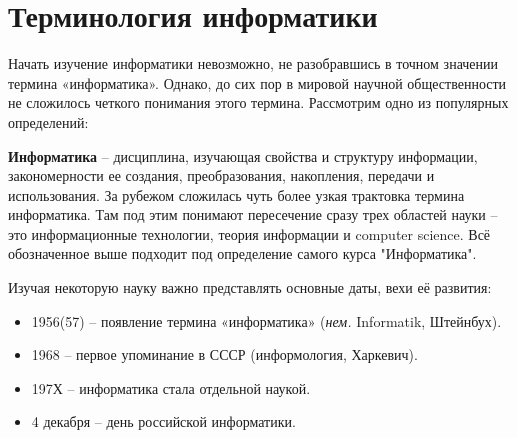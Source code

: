 \section{Терминология информатики}

Начать изучение информатики невозможно, не разобравшись в точном значении термина «информатика». Однако, до сих пор в мировой научной общественности не сложилось четкого понимания этого термина. Рассмотрим одно из популярных определений:

\textbf{Информатика} – дисциплина, изучающая свойства и структуру информации, закономерности ее создания, преобразования, накопления, передачи и использования. За рубежом сложилась чуть более узкая трактовка термина информатика. Там под этим понимают пересечение сразу трех областей науки – это информационные технологии, теория информации и computer science. Всё обозначенное выше подходит под определение самого курса "Информатика".

Изучая некоторую науку важно представлять основные даты, вехи её развития:
\begin{itemize}
\item 1956(57) – появление термина «информатика» (\textit{нем.} Informatik, Штейнбух).
\item 1968 – первое упоминание в СССР (информология, Харкевич).
\item 197Х – информатика стала отдельной наукой.
\item 4 декабря – день российской информатики.
\end{itemize}